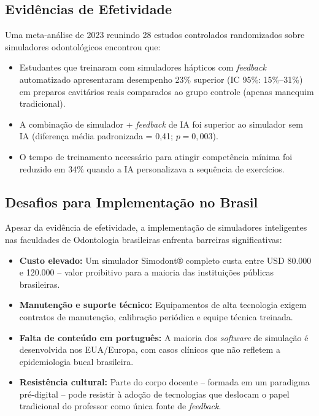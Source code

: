 \subsection{Evidências de Efetividade}

Uma meta-análise de 2023 reunindo 28 estudos controlados randomizados sobre
simuladores odontológicos encontrou que:

\begin{itemize}
  \item Estudantes que treinaram com simuladores hápticos com \textit{feedback}
    automatizado apresentaram desempenho 23\% superior (IC 95\%: 15\%--31\%) em
    preparos cavitários reais comparados ao grupo controle (apenas manequim
    tradicional).
  \item A combinação de simulador + \textit{feedback} de IA foi superior ao
    simulador sem IA (diferença média padronizada = 0,41; $p = 0,003$).
  \item O tempo de treinamento necessário para atingir competência mínima foi
    reduzido em 34\% quando a IA personalizava a sequência de exercícios.
\end{itemize}


\subsection{Desafios para Implementação no Brasil}

Apesar da evidência de efetividade, a implementação de simuladores inteligentes
nas faculdades de Odontologia brasileiras enfrenta barreiras significativas:

\begin{itemize}
  \item \textbf{Custo elevado:} Um simulador Simodont® completo custa entre
    USD 80.000 e 120.000 -- valor proibitivo para a maioria das instituições
    públicas brasileiras.

  \item \textbf{Manutenção e suporte técnico:} Equipamentos de alta tecnologia
    exigem contratos de manutenção, calibração periódica e equipe técnica
    treinada.

  \item \textbf{Falta de conteúdo em português:} A maioria dos \textit{software}
    de simulação é desenvolvida nos EUA/Europa, com casos clínicos que não
    refletem a epidemiologia bucal brasileira.

  \item \textbf{Resistência cultural:} Parte do corpo docente -- formada em um
    paradigma pré-digital -- pode resistir à adoção de tecnologias que
    deslocam o papel tradicional do professor como única fonte de
    \textit{feedback}.
\end{itemize}

